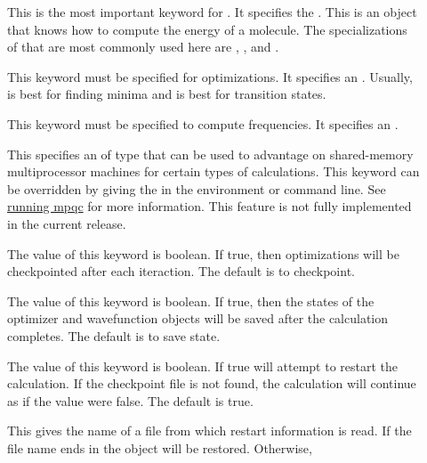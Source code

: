 \begin{description}
\item[] This is the most important keyword for .
        It specifies the 
        .  This is an object that knows how to
        compute the energy of a molecule.  The specializations of
         that are most commonly used here are
        , , and .
\item[] This keyword must be specified for optimizations.  It
        specifies an  .
        Usually,  is best for finding minima and
         is best for transition states.
\item[] This keyword must be specified to compute frequencies.
        It specifies an 
        .
\item[] This specifies an  of type
         that can be used to advantage on shared-memory
        multiprocessor machines for certain types of calculations.  This
        keyword can be overridden by giving the  in the
        environment or command line.  See
        \hyperref{the section on running MPQC}{Section~}{}{running mpqc}
        for more information.
        This feature is not fully implemented in the current release.
\item[] The value of this keyword is boolean.  If true,
        then optimizations will be checkpointed after each iteraction.  The
        default is to checkpoint.
\item[] The value of this keyword is boolean.  If true,
        then the states of the optimizer and wavefunction objects will be
        saved after the calculation completes.  The default is to save
        state.
\item[] The value of this keyword is boolean.  If true
         will attempt to restart the calculation.  If the
        checkpoint file is not found, the calculation will continue as if
        the value were false. The default is true.
\item[] This gives the name of a file from which
        restart information is read.  If the file name ends in
         the  object will be restored.  Otherwise,

\end{description}
